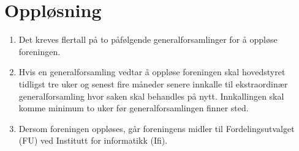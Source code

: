 \documentclass[8pt,norsk,a4paper]{article}
\begin{document}
\section{Oppløsning}\label{sec:opplosning}
\begin{enumerate}
        \item{Det kreves  flertall på to påfølgende generalforsamlinger for å oppløse foreningen.}
        \item{Hvis en generalforsamling vedtar å oppløse foreningen skal hovedstyret tidligst tre uker og senest fire måneder senere innkalle til ekstraordinær generalforsamling hvor saken skal behandles på nytt. Innkallingen skal komme minimum to uker før generalforsamlingen finner sted.}
        \item{Dersom foreningen oppløses, går foreningens midler til Fordelingsutvalget (FU) ved Institutt for informatikk (Ifi).}
\end{enumerate}
\end{document}
